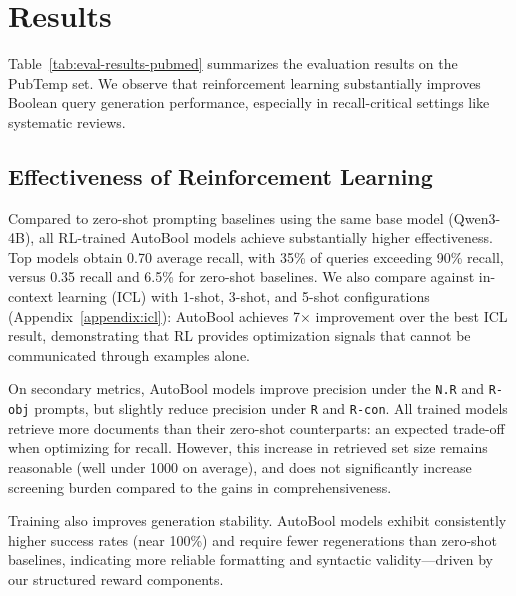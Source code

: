 \section{Results}



Table~\ref{tab:eval-results-pubmed} summarizes the evaluation results on the PubTemp set. We observe that reinforcement learning substantially improves Boolean query generation performance, especially in recall-critical settings like systematic reviews. 

\subsection{Effectiveness of Reinforcement Learning}
Compared to zero-shot prompting baselines using the same base model (Qwen3-4B), all RL-trained AutoBool models achieve substantially higher effectiveness. Top models obtain 0.70 average recall, with 35\% of queries exceeding 90\% recall, versus 0.35 recall and 6.5\% for zero-shot baselines. We also compare against in-context learning (ICL) with 1-shot, 3-shot, and 5-shot configurations (Appendix~\ref{appendix:icl}): AutoBool achieves 7× improvement over the best ICL result, demonstrating that RL provides optimization signals that cannot be communicated through examples alone.

On secondary metrics, AutoBool models improve precision under the \texttt{N.R} and \texttt{R-obj} prompts, but slightly reduce precision under \texttt{R} and \texttt{R-con}. All trained models retrieve more documents than their zero-shot counterparts: an expected trade-off when optimizing for recall. However, this increase in retrieved set size remains reasonable (well under 1000 on average), and does not significantly increase screening burden compared to the gains in comprehensiveness.


Training also improves generation stability. AutoBool models exhibit consistently higher success rates (near 100\%) and require fewer regenerations than zero-shot baselines, indicating more reliable formatting and syntactic validity—driven by our structured reward components.

